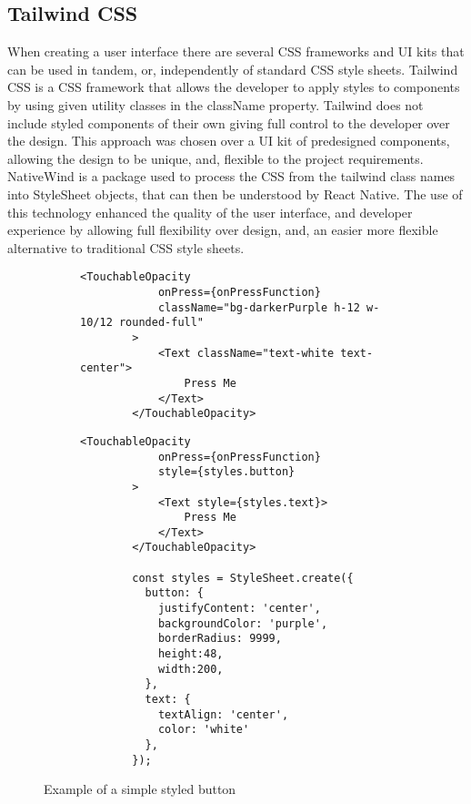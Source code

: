 \subsection{Tailwind CSS}
When creating a user interface there are several CSS frameworks and UI kits that can be used in tandem, or, independently of standard CSS style sheets. Tailwind CSS \cite{tailwind} is a CSS framework that allows the developer to apply styles to components by using given utility classes in the className property. Tailwind does not include styled components of their own giving full control to the developer over the design. This approach was chosen over a UI kit of predesigned components, allowing the design to be unique, and, flexible to the project requirements. NativeWind \cite{nativewind} is a package used to process the CSS from the tailwind class names into StyleSheet objects, that can then be understood by React Native. The use of this technology enhanced the quality of the user interface, and developer experience by allowing full flexibility over design, and, an easier more flexible alternative to traditional CSS style sheets. 
\begin{figure}[!htbp]
    \centering
    \begin{subfigure}[b]{0.42\textwidth}
        \begin{lstlisting}[language=jsJsx, caption={Styled using Tailwind CSS}]
        <TouchableOpacity
            onPress={onPressFunction}
            className="bg-darkerPurple h-12 w-10/12 rounded-full"
        >
            <Text className="text-white text-center">
                Press Me
            </Text>
        </TouchableOpacity>
        \end{lstlisting}
    \end{subfigure}
    \hspace{2em}
    \begin{subfigure}[b]{0.45\textwidth}
        \begin{lstlisting}[language=jsJsx, caption={Styled using a traditional StyleSheet}]
        <TouchableOpacity
            onPress={onPressFunction}
            style={styles.button}
        >
            <Text style={styles.text}>
                Press Me
            </Text>
        </TouchableOpacity>
            
        const styles = StyleSheet.create({
          button: {
            justifyContent: 'center',
            backgroundColor: 'purple',
            borderRadius: 9999,
            height:48,
            width:200,
          },
          text: {
            textAlign: 'center',
            color: 'white'
          },
        });
        \end{lstlisting}
    \end{subfigure}
    \caption{Example of a simple styled button}
    \label{fig:tailwind}
\end{figure}
\FloatBarrier
